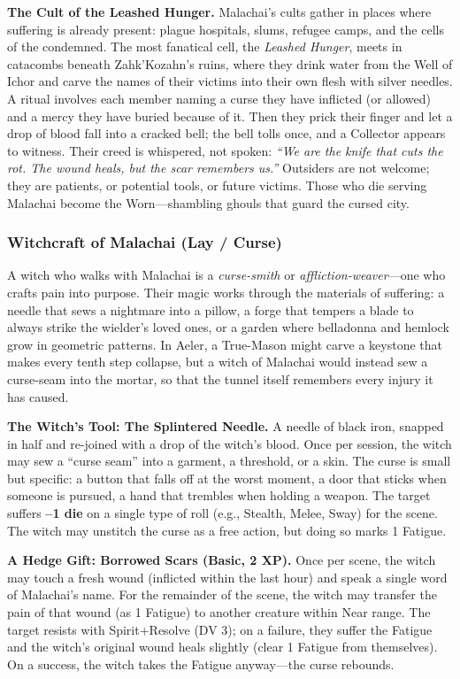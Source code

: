 \textbf{The Cult of the Leashed Hunger.} Malachai's cults gather in places where suffering is already present: plague hospitals, slums, refugee camps, and the cells of the condemned. The most fanatical cell, the \textit{Leashed Hunger}, meets in catacombs beneath Zahk'Kozahn's ruins, where they drink water from the Well of Ichor and carve the names of their victims into their own flesh with silver needles. A ritual involves each member naming a curse they have inflicted (or allowed) and a mercy they have buried because of it. Then they prick their finger and let a drop of blood fall into a cracked bell; the bell tolls once, and a Collector appears to witness. Their creed is whispered, not spoken: \textit{``We are the knife that cuts the rot. The wound heals, but the scar remembers us.''} Outsiders are not welcome; they are patients, or potential tools, or future victims. Those who die serving Malachai become the Worn---shambling ghouls that guard the cursed city.

\subsubsection*{Witchcraft of Malachai (Lay / Curse)}

A witch who walks with Malachai is a \textit{curse-smith} or \textit{affliction-weaver}---one who crafts pain into purpose. Their magic works through the materials of suffering: a needle that sews a nightmare into a pillow, a forge that tempers a blade to always strike the wielder's loved ones, or a garden where belladonna and hemlock grow in geometric patterns. In Aeler, a True-Mason might carve a keystone that makes every tenth step collapse, but a witch of Malachai would instead sew a curse-seam into the mortar, so that the tunnel itself remembers every injury it has caused.

\textbf{The Witch's Tool: The Splintered Needle.} A needle of black iron, snapped in half and re-joined with a drop of the witch's blood. Once per session, the witch may sew a ``curse seam'' into a garment, a threshold, or a skin. The curse is small but specific: a button that falls off at the worst moment, a door that sticks when someone is pursued, a hand that trembles when holding a weapon. The target suffers \textbf{--1 die} on a single type of roll (e.g., Stealth, Melee, Sway) for the scene. The witch may unstitch the curse as a free action, but doing so marks 1 Fatigue.

\textbf{A Hedge Gift: Borrowed Scars (Basic, 2 XP).} Once per scene, the witch may touch a fresh wound (inflicted within the last hour) and speak a single word of Malachai's name. For the remainder of the scene, the witch may transfer the pain of that wound (as 1 Fatigue) to another creature within Near range. The target resists with Spirit+Resolve (DV 3); on a failure, they suffer the Fatigue and the witch's original wound heals slightly (clear 1 Fatigue from themselves). On a success, the witch takes the Fatigue anyway---the curse rebounds.

